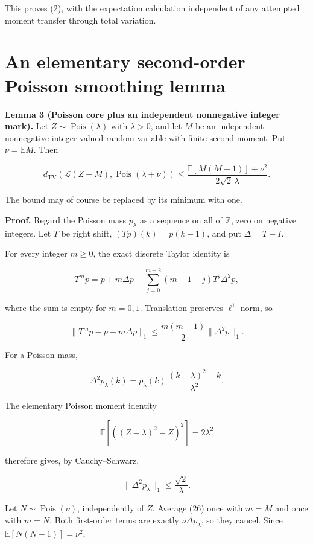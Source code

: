 \documentclass[
  11pt,
]{article}
\begin{document}
This proves (2), with the expectation calculation independent of any
attempted moment transfer through total variation.

\section{An elementary second-order Poisson smoothing
lemma}\label{an-elementary-second-order-poisson-smoothing-lemma}

\textbf{Lemma 3 (Poisson core plus an independent nonnegative integer
mark).} Let \(Z\sim\operatorname{Pois}(\lambda)\) with \(\lambda>0\),
and let \(M\) be an independent nonnegative integer-valued random
variable with finite second moment. Put \(\nu=\mathbb EM\). Then

\[
\boxed{
 d_{\mathrm{TV}}\!\left(
 \mathcal L(Z+M),\operatorname{Pois}(\lambda+\nu)\right)
 \le
 \frac{\mathbb E[M(M-1)]+\nu^2}{2\sqrt2\,\lambda}.}
\tag{25}
\]

The bound may of course be replaced by its minimum with one.

\textbf{Proof.} Regard the Poisson mass \(p_\lambda\) as a sequence on
all of \(\mathbb Z\), zero on negative integers. Let \(T\) be right
shift, \((Tp)(k)=p(k-1)\), and put \(\Delta=T-I\).

For every integer \(m\ge0\), the exact discrete Taylor identity is

\[
 T^mp=p+m\Delta p+
 \sum_{j=0}^{m-2}(m-1-j)T^j\Delta^2p,
\tag{26}
\]

where the sum is empty for \(m=0,1\). Translation preserves \(\ell^1\)
norm, so

\[
 \|T^mp-p-m\Delta p\|_1
 \le\frac{m(m-1)}2\|\Delta^2p\|_1.
\tag{27}
\]

For a Poisson mass,

\[
 \Delta^2p_\lambda(k)
 =p_\lambda(k)\,
 \frac{(k-\lambda)^2-k}{\lambda^2}.
\tag{28}
\]

The elementary Poisson moment identity

\[
 \mathbb E\left[((Z-\lambda)^2-Z)^2\right]=2\lambda^2
\tag{29}
\]

therefore gives, by Cauchy--Schwarz,

\[
 \|\Delta^2p_\lambda\|_1\le\frac{\sqrt2}{\lambda}.
\tag{30}
\]

Let \(N\sim\operatorname{Pois}(\nu)\), independently of \(Z\). Average
(26) once with \(m=M\) and once with \(m=N\). Both first-order terms are
exactly \(\nu\Delta p_\lambda\), so they cancel. Since
\(\mathbb E[N(N-1)]=\nu^2\),
\end{document}
